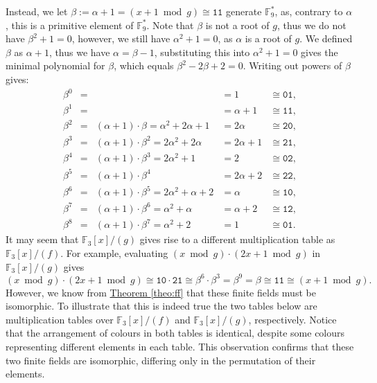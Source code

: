 \documentclass[openany, a4paper, 10pt]{book}
\theoremstyle{plain}
\theoremstyle{plain}
\theoremstyle{plain}
\theoremstyle{definition}
\theoremstyle{plain}
\theoremstyle{definition}
\theoremstyle{remark}
\newcommand{\theoref}[1]{\hyperref[#1]{Theorem \ref{#1}}}
\begin{document}
\begin{examplebox}
    Instead, we let $\beta := \alpha+1 = (x+1 \bmod g) \cong \texttt{11}$ generate $\mathbb F_9^*$, as, contrary to $\alpha$, this is a primitive element of $\mathbb F_9^*$.
    Note that $\beta$ is not a root of $g$, thus we do not have $\beta^2+1=0$, however, we still have $\alpha^2+1=0$, as $\alpha$ is a root of $g$.
    We defined $\beta$ as $\alpha+1$, thus we have $\alpha=\beta-1$, substituting this into $\alpha^2+1=0$ gives the minimal polynomial for $\beta$, which equals $\beta^2-2\beta+2=0$.
    Writing out powers of $\beta$ gives:
    {\allowdisplaybreaks\begin{align*}
        \beta^0&=&&=1&\cong\texttt{01},\\
        \beta^1&=&&=\alpha+1&\cong\texttt{11},\\
        \beta^2&=&(\alpha+1)\cdot\beta=\alpha^2+2\alpha+1&=2\alpha&\cong\texttt{20},\\
        \beta^3&=&(\alpha+1)\cdot\beta^2=2\alpha^2+2\alpha&=2\alpha+1&\cong\texttt{21},\\
        \beta^4&=&(\alpha+1)\cdot\beta^3=2\alpha^2+1&=2&\cong\texttt{02},\\
        \beta^5&=&(\alpha+1)\cdot\beta^4&=2\alpha+2&\cong\texttt{22},\\
        \beta^6&=&(\alpha+1)\cdot\beta^5=2\alpha^2+\alpha+2&=\alpha&\cong\texttt{10},\\
        \beta^7&=&(\alpha+1)\cdot\beta^6=\alpha^2+\alpha&=\alpha+2&\cong\texttt{12},\\
        \beta^8&=&(\alpha+1)\cdot\beta^7=\alpha^2+2&=1&\cong\texttt{01}.
    \end{align*}
    }It may seem that $\mathbb F_3[x]/(g)$ gives rise to a different multiplication table as $\mathbb F_3[x]/(f)$.
    For example, evaluating $(x \bmod g) \cdot (2x+1 \bmod g)$ in $\mathbb F_3[x]/(g)$ gives
    $$(x \bmod g) \cdot (2x+1 \bmod g) \cong \texttt{10} \cdot \texttt{21} \cong \beta^6 \cdot \beta^3 = \beta^9 = \beta \cong \texttt{11} \cong (x+1 \bmod g).$$
    However, we know from \theoref{theo:ff} that these finite fields must be isomorphic.
    To illustrate that this is indeed true the two tables below are multiplication tables over $\mathbb F_3[x]/(f)$ and $\mathbb F_3[x]/(g)$, respectively.
    Notice that the arrangement of colours in both tables is identical, despite some colours representing different elements in each table.
    This observation confirms that these two finite fields are isomorphic, differing only in the permutation of their elements.
    \begin{figure}[H]

\end{figure}
\end{examplebox}
\end{document}
